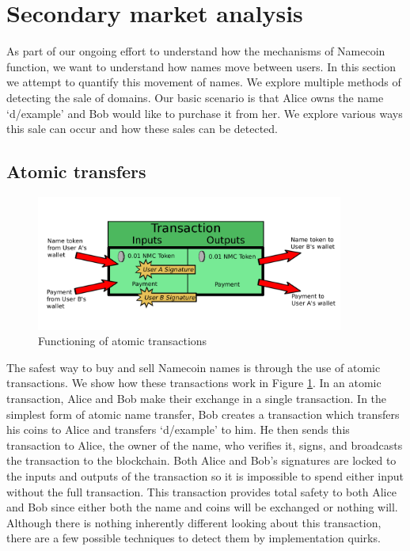 \section{Secondary market analysis}
\label{sec:methods}
As part of our ongoing effort to understand how the mechanisms of Namecoin function, we want to understand how names move between users. In this section we attempt to quantify this movement of names. We explore multiple methods of detecting the sale of domains. Our basic scenario is that Alice owns the name `d/example' and Bob would like to purchase it from her. We explore various ways this sale can occur and how these sales can be detected.

\subsection{Atomic transfers}

\begin{figure}
  \centering
  \includegraphics[width=0.9\textwidth]{figures/atomicTX}
  \caption{Functioning of atomic transactions}
  \label{fig:atomic}
\end{figure}

The safest way to buy and sell Namecoin names is through the use of atomic transactions. We show how these transactions work in Figure \ref{fig:atomic}. In an atomic transaction, Alice and Bob make their exchange in a single transaction. In the simplest form of atomic name transfer, Bob creates a transaction which transfers his coins to Alice and transfers `d/example' to him. He then sends this transaction to Alice, the owner of the name, who verifies it, signs, and broadcasts the transaction to the blockchain. Both Alice and Bob's signatures are locked to the inputs and outputs of the transaction so it is impossible to spend either input without the full transaction. This transaction provides total safety to both Alice and Bob since either both the name and coins will be exchanged or nothing will. Although there is nothing inherently different looking about this transaction, there are a few possible techniques to detect them by implementation quirks.

